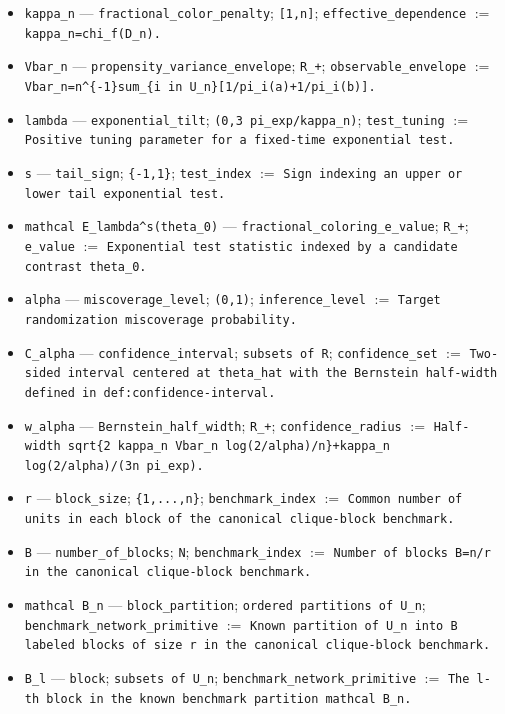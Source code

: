 \documentclass{article}
\begin{document}
\begin{itemize}
  \item \texttt{kappa\_n} --- \texttt{fractional\_color\_penalty}; \texttt{[1,n]}; \texttt{effective\_dependence} $:=$ \texttt{kappa\_n=chi\_f(D\_n).}
  \item \texttt{Vbar\_n} --- \texttt{propensity\_variance\_envelope}; \texttt{R\_+}; \texttt{observable\_envelope} $:=$ \texttt{Vbar\_n=n\textasciicircum{}\{-1\}sum\_\{i in U\_n\}[1/pi\_i(a)+1/pi\_i(b)].}
  \item \texttt{lambda} --- \texttt{exponential\_tilt}; \texttt{(0,3 pi\_exp/kappa\_n)}; \texttt{test\_tuning} $:=$ \texttt{Positive tuning parameter for a fixed-time exponential test.}
  \item \texttt{s} --- \texttt{tail\_sign}; \texttt{\{-1,1\}}; \texttt{test\_index} $:=$ \texttt{Sign indexing an upper or lower tail exponential test.}
  \item \texttt{mathcal E\_lambda\textasciicircum{}s(theta\_0)} --- \texttt{fractional\_coloring\_e\_value}; \texttt{R\_+}; \texttt{e\_value} $:=$ \texttt{Exponential test statistic indexed by a candidate contrast theta\_0.}
  \item \texttt{alpha} --- \texttt{miscoverage\_level}; \texttt{(0,1)}; \texttt{inference\_level} $:=$ \texttt{Target randomization miscoverage probability.}
  \item \texttt{C\_alpha} --- \texttt{confidence\_interval}; \texttt{subsets of R}; \texttt{confidence\_set} $:=$ \texttt{Two-sided interval centered at theta\_hat with the Bernstein half-width defined in def:confidence-interval.}
  \item \texttt{w\_alpha} --- \texttt{Bernstein\_half\_width}; \texttt{R\_+}; \texttt{confidence\_radius} $:=$ \texttt{Half-width sqrt\{2 kappa\_n Vbar\_n log(2/alpha)/n\}+kappa\_n log(2/alpha)/(3n pi\_exp).}
  \item \texttt{r} --- \texttt{block\_size}; \texttt{\{1,...,n\}}; \texttt{benchmark\_index} $:=$ \texttt{Common number of units in each block of the canonical clique-block benchmark.}
  \item \texttt{B} --- \texttt{number\_of\_blocks}; \texttt{N}; \texttt{benchmark\_index} $:=$ \texttt{Number of blocks B=n/r in the canonical clique-block benchmark.}
  \item \texttt{mathcal B\_n} --- \texttt{block\_partition}; \texttt{ordered partitions of U\_n}; \texttt{benchmark\_network\_primitive} $:=$ \texttt{Known partition of U\_n into B labeled blocks of size r in the canonical clique-block benchmark.}
  \item \texttt{B\_l} --- \texttt{block}; \texttt{subsets of U\_n}; \texttt{benchmark\_network\_primitive} $:=$ \texttt{The l-th block in the known benchmark partition mathcal B\_n.}

\end{itemize}
\end{document}
